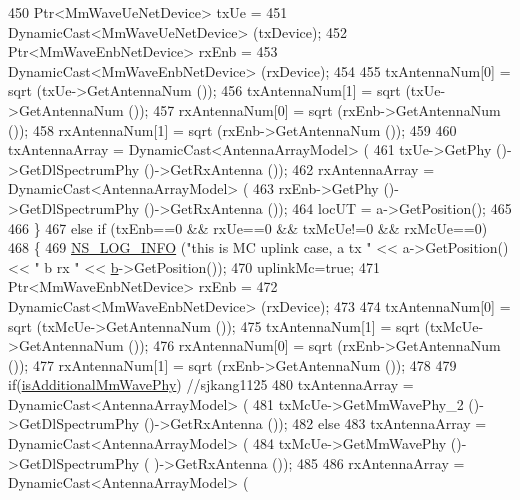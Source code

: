\begin{DoxyCode}
450                 Ptr<MmWaveUeNetDevice> txUe =
451                                                 DynamicCast<MmWaveUeNetDevice> (txDevice);
452                 Ptr<MmWaveEnbNetDevice> rxEnb =
453                                                 DynamicCast<MmWaveEnbNetDevice> (rxDevice);
454 
455                 txAntennaNum[0] = sqrt (txUe->GetAntennaNum ());
456                 txAntennaNum[1] = sqrt (txUe->GetAntennaNum ());
457                 rxAntennaNum[0] = sqrt (rxEnb->GetAntennaNum ());
458                 rxAntennaNum[1] = sqrt (rxEnb->GetAntennaNum ());
459 
460                 txAntennaArray = DynamicCast<AntennaArrayModel> (
461                                         txUe->GetPhy ()->GetDlSpectrumPhy ()->GetRxAntenna ());
462                 rxAntennaArray = DynamicCast<AntennaArrayModel> (
463                                         rxEnb->GetPhy ()->GetDlSpectrumPhy ()->GetRxAntenna ());
464                 locUT = a->GetPosition();
465 
466         \}
467         \textcolor{keywordflow}{else} \textcolor{keywordflow}{if} (txEnb==0 && rxUe==0 && txMcUe!=0 && rxMcUe==0)
468         \{
469                 \hyperlink{group__logging_gafbd73ee2cf9f26b319f49086d8e860fb}{NS\_LOG\_INFO} (\textcolor{stringliteral}{"this is MC uplink case, a tx "} << a->GetPosition() << \textcolor{stringliteral}{" b rx "} << 
      \hyperlink{buildings__pathloss_8m_a21ad0bd836b90d08f4cf640b4c298e7c}{b}->GetPosition());
470                 uplinkMc=\textcolor{keyword}{true};
471                 Ptr<MmWaveEnbNetDevice> rxEnb =
472                                                 DynamicCast<MmWaveEnbNetDevice> (rxDevice);
473 
474                 txAntennaNum[0] = sqrt (txMcUe->GetAntennaNum ());
475                 txAntennaNum[1] = sqrt (txMcUe->GetAntennaNum ());
476                 rxAntennaNum[0] = sqrt (rxEnb->GetAntennaNum ());
477                 rxAntennaNum[1] = sqrt (rxEnb->GetAntennaNum ());
478 
479                 \textcolor{keywordflow}{if}(\hyperlink{classns3_1_1MmWave3gppChannel_a5b921c4b6e89174bf383382c1ce6523f}{isAdditionalMmWavePhy}) \textcolor{comment}{//sjkang1125}
480                 txAntennaArray = DynamicCast<AntennaArrayModel> (
481                                         txMcUe->GetMmWavePhy\_2 ()->GetDlSpectrumPhy ()->GetRxAntenna ());
482                 \textcolor{keywordflow}{else}
483                         txAntennaArray = DynamicCast<AntennaArrayModel> (
484                                                                 txMcUe->GetMmWavePhy ()->GetDlSpectrumPhy (
      )->GetRxAntenna ());
485 
486                 rxAntennaArray = DynamicCast<AntennaArrayModel> (

\end{DoxyCode}
